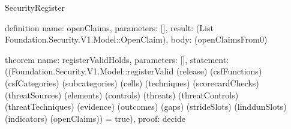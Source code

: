 \begin{lexlean}{SecurityRegister}
\begin{semanticmodule}
definition{
  name: openClaims,
  parameters: [],
  result: (List Foundation.Security.V1.Model::OpenClaim),
  body: (openClaimsFrom0)
}

theorem{
  name: registerValidHolds,
  parameters: [],
  statement: ((Foundation.Security.V1.Model::registerValid (release) (csfFunctions) (csfCategories) (subcategories) (cells) (techniques) (scorecardChecks) (threatSources) (elements) (controls) (threats) (threatControls) (threatTechniques) (evidence) (outcomes) (gaps) (strideSlots) (linddunSlots) (indicators) (openClaims)) = true),
  proof: decide{}
}
\end{semanticmodule}
\end{lexlean}
